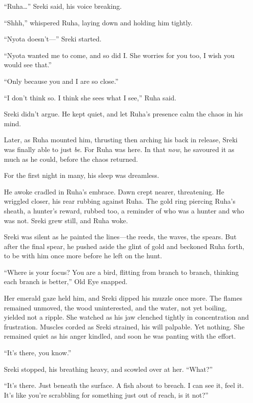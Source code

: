 ``Ruha\ldots'' Sreki said, his voice breaking.

``Shhh,'' whispered Ruha, laying down and holding him tightly.

``Nyota doesn't---'' Sreki started.

``Nyota wanted me to come, and so did I. She worries for you too, I wish you would see that.''

``Only because you and I are so close.''

``I don't think so. I think she sees what I see,'' Ruha said.

Sreki didn't argue. He kept quiet, and let Ruha's presence calm the chaos in his mind.

Later, as Ruha mounted him, thrusting then arching his back in release, Sreki was finally able to just \emph{be}. For Ruha was here. In that \emph{now}, he savoured it as much as he could, before the chaos returned.

For the first night in many, his sleep was dreamless.

He awoke cradled in Ruha's embrace. Dawn crept nearer, threatening. He wriggled closer, his rear rubbing against Ruha. The gold ring piercing Ruha's sheath, a hunter's reward, rubbed too, a reminder of who was a hunter and who was not. Sreki grew still, and Ruha woke.

Sreki was silent as he painted the lines---the reeds, the waves, the spears. But after the final spear, he pushed aside the glint of gold and beckoned Ruha forth, to be with him once more before he left on the hunt.

\secdiv

\noindent ``Where is your focus? You are a bird, flitting from branch to branch, thinking each branch is better,'' Old Eye snapped.

Her emerald gaze held him, and Sreki dipped his muzzle once more. The flames remained unmoved, the wood uninterested, and the water, not yet boiling, yielded not a ripple. She watched as his jaw clenched tightly in concentration and frustration. Muscles corded as Sreki strained, his will palpable. Yet nothing. She remained quiet as his anger kindled, and soon he was panting with the effort.

``It's there, you know.''

Sreki stopped, his breathing heavy, and scowled over at her. ``What?''

``It's there. Just beneath the surface. A fish about to breach. I can see it, feel it. It's like you're scrabbling for something just out of reach, is it not?''

